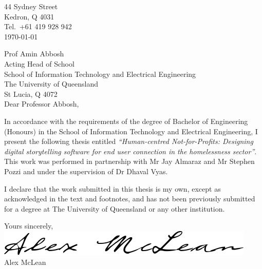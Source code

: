 \begin{flushright}
    44 Sydney Street\\
    Kedron, Q 4031\\
    Tel.\ +61 419 928 942\\
    \medskip
    \today
\end{flushright}
\begin{flushleft}
    Prof Amin Abbosh\\
    Acting Head of School\\
    School of Information Technology and Electrical Engineering\\
    The University of Queensland\\
    St Lucia, Q 4072\\
    \bigskip\bigskip
    Dear Professor Abbosh,
\end{flushleft}

In accordance with the requirements of the degree of Bachelor of Engineering (Honours) in the School of Information Technology and Electrical Engineering, I present the following thesis entitled \emph{“Human-centred Not-for-Profits: Designing digital storytelling software for end user connection in the homelessness sector”}. This work was performed in partnership with Mr Jay Almaraz and Mr Stephen Pozzi and under the supervision of Dr Dhaval Vyas.

I declare that the work submitted in this thesis is my own, except as acknowledged in the text and footnotes, and has not been previously submitted for a degree at The University of Queensland or any other institution.

\begin{flushright}
    Yours sincerely,\\
    \medskip
    \includegraphics[scale=0.4]{assets/sig.png}\\
    \medskip
    Alex McLean
\end{flushright}

\cleardoublepage